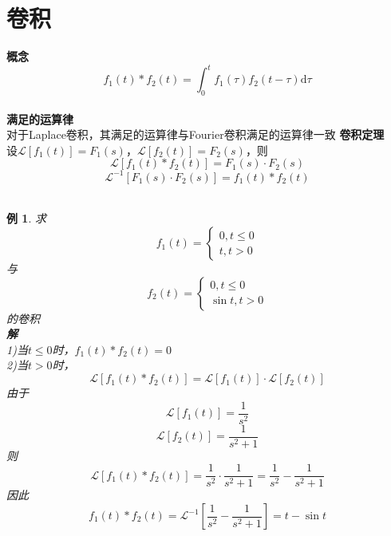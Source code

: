 \documentclass[12pt, a4paper, twoside]{ctexbook}
\newtheorem{example}[theorem]{例}
\begin{document}
\section{卷积}
\textbf{概念}\\
$$
f_1\left(t\right)\ast f_2\left(t\right) = \int_{0}^{t}{f_1\left(\tau\right)f_2\left(t-\tau\right)\mathrm{d}\tau}
$$
~\\

\textbf{满足的运算律}\\
对于Laplace卷积，其满足的运算律与Fourier卷积满足的运算律一致
\newpage
\textbf{卷积定理}\\
设$\mathscr{L}\left[f_1\left(t\right)\right]=F_1\left(s\right)$，$\mathscr{L}\left[f_2\left(t\right)\right]=F_2\left(s\right)$，则
$$
\mathscr{L}\left[f_1\left(t\right)\ast f_2\left(t\right)\right] = F_1\left(s\right)\cdot F_2\left(s\right)
$$
$$
\mathscr{L}^{-1}\left[ F_1\left(s\right)\cdot F_2\left(s\right) \right] = f_1\left(t\right)\ast f_2\left(t\right)
$$
~\\

\begin{example}
    求
    $$
    f_1\left(t\right)=\begin{cases}
        0,t\leqslant0\\
        t,t>0
    \end{cases}
    $$
    \hspace*{2em}与
    $$
    f_2\left(t\right)=\begin{cases}
        0,t\leqslant0\\
        \sin t,t>0
    \end{cases}
    $$
    \hspace*{2em}的卷积\\
    \hspace*{1em}\textbf{解}\\
    \hspace*{2em}1)当$t\leqslant0$时，$f_1\left(t\right)\ast f_2\left(t\right)=0$\\
    \hspace*{2em}2)当$t>0$时，
    $$
    \mathscr{L}\left[f_1\left(t\right)\ast f_2\left(t\right)\right] = \mathscr{L}\left[f_1\left(t\right)\right]\cdot\mathscr{L}\left[f_2\left(t\right)\right]
    $$
    \hspace*{2em}由于
    $$
    \mathscr{L}\left[f_1\left(t\right)\right]=\frac{1}{s^2}
    $$
    $$
    \mathscr{L}\left[f_2\left(t\right)\right]=\frac{1}{s^2+1}
    $$
    \hspace*{2em}则
    $$
    \mathscr{L}\left[f_1\left(t\right)\ast f_2\left(t\right)\right]=\frac{1}{s^2}\cdot\frac{1}{s^2+1}=\frac{1}{s^2}-\frac{1}{s^2+1}
    $$
    \hspace*{2em}因此
    $$
    f_1\left(t\right)\ast f_2\left(t\right)=\mathscr{L}^{-1}\left[\frac{1}{s^2}-\frac{1}{s^2+1}\right]=t-\sin t
    $$
\end{example}
~\\
\end{document}
